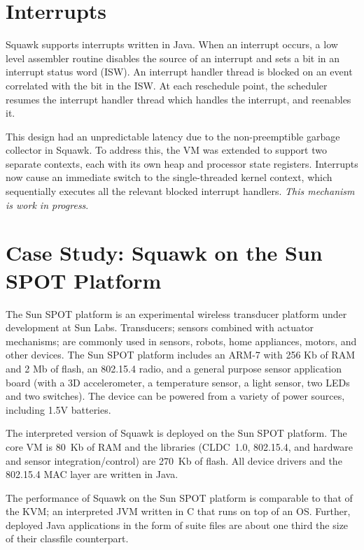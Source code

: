 \documentclass{sig-alt-sun}
\begin{document}
\section{Interrupts}

Squawk supports interrupts written in Java. 
When an interrupt occurs, a low level 
assembler routine disables the source of an interrupt and sets a bit in an
interrupt status word (ISW). An interrupt handler thread
is blocked on an event correlated with the bit in the ISW.
At each reschedule point, the scheduler resumes the interrupt 
handler thread which handles the interrupt, and reenables it. 


This design had an unpredictable latency due to the 
non-preemptible garbage collector in Squawk. To address this,
the VM was extended to support two separate contexts, each 
with its own heap and processor state registers.
Interrupts now cause an immediate switch to the single-threaded kernel context,
which sequentially executes all the relevant blocked interrupt handlers. 
{\em This mechanism is work in progress}. 

\section{Case Study: Squawk on the Sun SPOT Platform}

The Sun SPOT platform is an experimental wireless transducer 
platform under development at Sun Labs.  Transducers; sensors combined
with actuator mechanisms; are commonly used in sensors, robots, home
appliances, motors, and other devices.
The Sun SPOT platform includes
an ARM-7 with 256 Kb of RAM and 2 Mb of flash, an 802.15.4 radio,
and a general purpose sensor application board (with a 3D accelerometer, 
a temperature sensor, a light sensor, two LEDs and two switches).  The device
can be powered from a variety of power sources, including 1.5V batteries.

The interpreted version of Squawk is deployed on the Sun SPOT platform. 
The core VM is 80~Kb of RAM and the 
libraries (CLDC~1.0, 802.15.4, and hardware and sensor integration/control) 
are 270~Kb of flash.  All device drivers and the 802.15.4 MAC layer are 
written in Java. 

The performance of Squawk on the Sun SPOT platform is comparable 
to that of the KVM; an interpreted JVM written in C that runs on top of an OS.  
Further, deployed Java applications in the form of suite files are about one 
third the size of their classfile counterpart.
\end{document}
